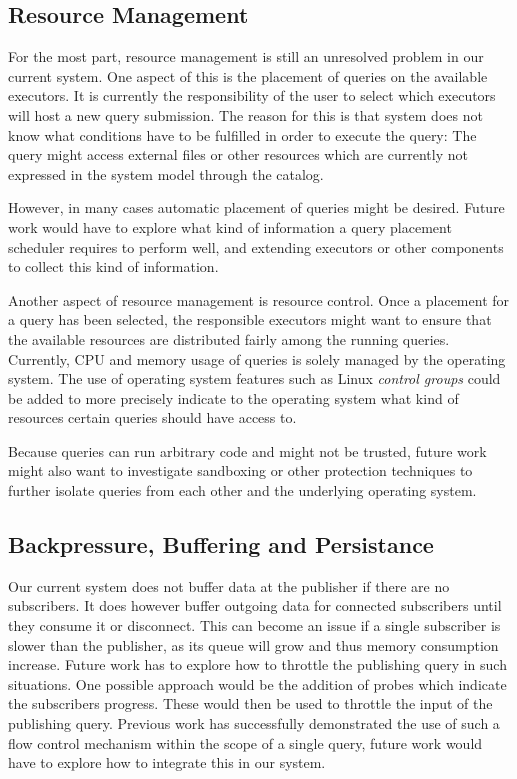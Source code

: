 \subsection{Resource Management}

For the most part, resource management is still an unresolved problem in our
current system. One aspect of this is the placement of queries on the available
executors. It is currently the responsibility of the user to select which executors
will host a new query submission.
The reason for this is that system does not know what conditions have to be
fulfilled in order to execute the query:
The query might access external files or other resources which are currently not
expressed in the system model through the catalog.

However, in many cases automatic placement of queries might be desired. Future
work would have to explore what kind of information a query placement scheduler
requires to perform well, and extending executors or other components to collect
this kind of information.

Another aspect of resource management is resource control. Once a placement
for a query has been selected, the responsible executors might want to ensure
that the available resources are distributed fairly among the
running queries. Currently, CPU and memory usage of queries is solely managed
by the operating system. The use of operating system features such as
Linux \emph{control groups} \cite{cgroups} could be added to more precisely indicate
to the operating system what kind of resources certain queries should have
access to.

Because queries can run arbitrary code and might not be trusted,
future work might also want to investigate sandboxing or other protection
techniques to further isolate queries from each other and the underlying operating
system.

\subsection{Backpressure, Buffering and Persistance}

Our current system does not buffer data at the publisher if there are no
subscribers. It does however buffer outgoing data for connected subscribers
until they consume it or disconnect. This can become an issue if a single
subscriber is slower than the publisher, as its queue will grow and thus
memory consumption increase. Future work has to explore how to throttle
the publishing query in such situations. One possible approach would be the
addition of probes which indicate the subscribers progress. These would then
be used to throttle the input of the publishing query. Previous work \cite{faucet} has
successfully demonstrated the use of such a flow control mechanism within the
scope of a single query, future work would have to explore how to integrate
this in our system.

